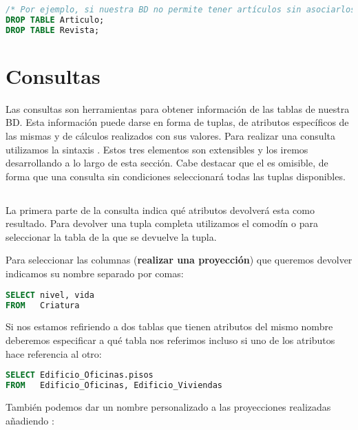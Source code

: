 \begin{lstlisting}[language=SQL]
/* Por ejemplo, si nuestra BD no permite tener artículos sin asociarlos a una revista */
DROP TABLE Articulo;
DROP TABLE Revista;
\end{lstlisting}

\section{Consultas}\label{consultas}

Las consultas son herramientas para obtener información de las tablas de nuestra BD\@.
Esta información puede darse en forma de tuplas, de atributos específicos de las mismas y de cálculos realizados con sus valores.
Para realizar una consulta utilizamos la sintaxis .
Estos tres elementos son extensibles y los iremos desarrollando a lo largo de esta sección.
Cabe destacar que el  es omisible, de forma que una consulta sin condiciones seleccionará todas las tuplas disponibles.

\subsection{}

La primera parte de la consulta indica qué atributos devolverá esta como resultado.
Para devolver una tupla completa utilizamos el comodín  o  para seleccionar la tabla de la que se devuelve la tupla.

Para seleccionar las columnas (\textbf{realizar una proyección}) que queremos devolver indicamos su nombre separado por comas:

\begin{lstlisting}[language=SQL]
SELECT nivel, vida
FROM   Criatura
\end{lstlisting}

Si nos estamos refiriendo a dos tablas que tienen atributos del mismo nombre deberemos especificar a qué tabla nos referimos incluso si uno de los atributos hace referencia al otro:

\begin{lstlisting}[language=SQL]
SELECT Edificio_Oficinas.pisos
FROM   Edificio_Oficinas, Edificio_Viviendas
\end{lstlisting}

También podemos dar un nombre personalizado a las proyecciones realizadas añadiendo :

